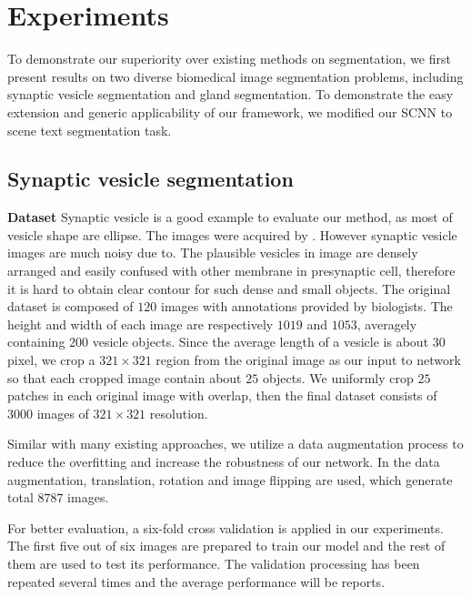 \section{Experiments}
\label{sec:results}
To demonstrate our superiority over existing methods on segmentation, we first present results on two diverse biomedical image segmentation problems, including synaptic vesicle segmentation and gland segmentation.
To demonstrate the easy extension and generic applicability of our framework, we modified our SCNN to scene text segmentation task.

\subsection{Synaptic vesicle segmentation}
\noindent\textbf{Dataset}
Synaptic vesicle is a good example to evaluate our method, as most of vesicle shape are ellipse.
The images were acquired by . 
However synaptic vesicle images are much noisy due to.
The plausible vesicles in image are densely arranged and easily confused with other membrane in presynaptic cell, therefore it is hard to obtain clear contour for such dense and small objects.
The original dataset is composed of $120$ images with annotations provided by biologists.
The height and width of each image are respectively $1019$ and $1053$, averagely containing $200$ vesicle objects.
Since the average length of a vesicle is about $30$ pixel, we crop a $321\times 321$ region from the original image as our input to network so that each cropped image contain about $25$ objects.
We uniformly crop $25$ patches in each original image with overlap, then the final dataset consists of $3000$ images of $321\times 321$ resolution.

Similar with many existing approaches, we utilize a data augmentation process to reduce the overfitting and increase the robustness of our network.
In the data augmentation, translation, rotation and image flipping are used, which generate total $8787$ images.

For better evaluation, a six-fold cross validation is applied in our experiments.
The first five out of six images are prepared to train our model and the rest of them are used to test its performance.
%
The validation processing has been repeated several times and the average performance will be reports.


